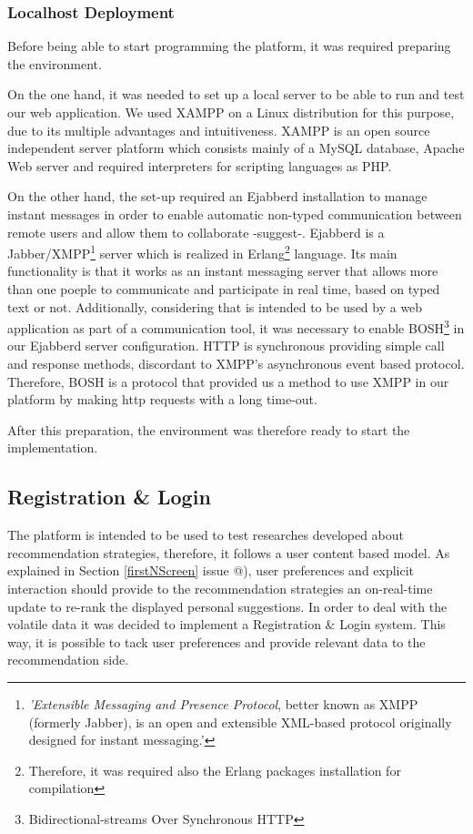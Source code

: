 \documentclass{acm_proc_article-sp}
\makeatletter
\newcommand*{\rom}[1]{\expandafter\@slowromancap\romannumeral #1@}
\makeatother
\begin{document}
\subsubsection{Localhost Deployment}

Before being able to start programming the platform, it was required preparing the environment. 

On the one hand, it was needed to set up a local server to be able to run and test our web application. We used XAMPP on a Linux distribution for this purpose, due to its multiple advantages and intuitiveness. XAMPP is an open source independent server platform which consists mainly of a MySQL database, Apache Web server and required interpreters for scripting languages as PHP. 

On the other hand, the set-up required an Ejabberd installation to manage instant messages in order to enable automatic non-typed communication between remote users and allow them to collaborate -suggest-. Ejabberd is a Jabber/XMPP\cite{wiki:xmpp}\footnote{\textit{'Extensible Messaging and Presence Protocol}, better known as XMPP (formerly Jabber), is an open and extensible XML-based protocol originally designed for instant messaging.'} server \cite{jia2010xmpp} which is realized in Erlang\footnote{Therefore, it was required also the Erlang packages installation for compilation} language. Its main functionality is that it works as an instant messaging server that allows more than one poeple to communicate and participate in real time, based on typed text or not. Additionally, considering that is intended to be used by a web application as part of a communication tool, it was necessary to enable BOSH\footnote{Bidirectional-streams Over Synchronous HTTP} in our Ejabberd server configuration. HTTP is synchronous providing simple call and response methods, discordant to XMPP's asynchronous event based protocol. Therefore, BOSH is a protocol that provided us a method to use XMPP in our platform by making http requests with a long time-out.

After this preparation, the environment was therefore ready to start the implementation. 
\subsection{Registration \& Login}

The platform is intended to be used to test researches developed about recommendation strategies, therefore, it follows a user content based model. As explained in Section \ref{firstNScreen} issue \rom{1}), user preferences and explicit interaction should provide to the recommendation strategies an on-real-time update to re-rank the displayed personal suggestions. In order to deal with the volatile data it was decided to implement a Registration \& Login system. This way, it is possible to tack user preferences and provide relevant data to the recommendation side. 
\end{document}
